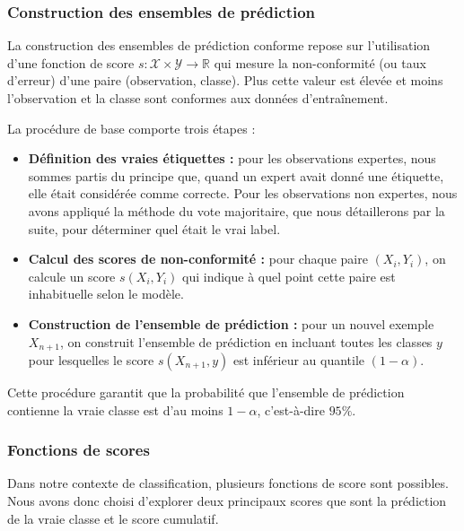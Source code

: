 \documentclass[a4paper,12pt]{article}
\begin{document}
\subsubsection{Construction des ensembles de prédiction}

La construction des ensembles de prédiction conforme repose sur l'utilisation d'une fonction de score $s : \mathcal{X} \times \mathcal{Y} \rightarrow \mathbb{R}$ qui mesure la non-conformité (ou taux d'erreur) d'une paire (observation, classe). Plus cette valeur est élevée et moins l'observation et la classe sont conformes aux données d'entraînement.

\vspace{0.2cm}

La procédure de base comporte trois étapes : 
\begin{itemize}
    \item \textbf{Définition des vraies étiquettes :} pour les observations expertes, nous sommes partis du principe que, quand un expert avait donné une étiquette, elle était considérée comme correcte. Pour les observations non expertes, nous avons appliqué la méthode du vote majoritaire, que nous détaillerons par la suite, pour déterminer quel était le vrai label.
    \item \textbf{Calcul des scores de non-conformité :} pour chaque paire $(X_i, Y_i)$, on calcule un score $s(X_i, Y_i)$ qui indique à quel point cette paire est inhabituelle selon le modèle.
    \item \textbf{Construction de l'ensemble de prédiction :} pour un nouvel exemple $X_{n+1}$, on construit l'ensemble de prédiction en incluant toutes les classes $y$ pour lesquelles le score $s(X_{n+1}, y)$ est inférieur au quantile $(1- \alpha)$.
\end{itemize}

\vspace{0.2cm}

Cette procédure garantit que la probabilité que l'ensemble de prédiction contienne la vraie classe est d'au moins $1- \alpha$, c'est-à-dire $95\%$.

\subsubsection{Fonctions de scores}

Dans notre contexte de classification, plusieurs fonctions de score sont possibles. Nous avons donc choisi d'explorer deux principaux scores que sont la prédiction de la vraie classe et le score cumulatif.
\end{document}
